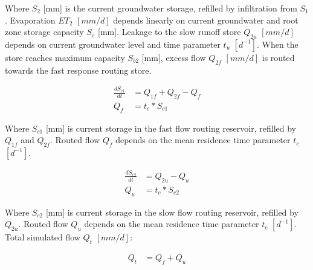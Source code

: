 Where $S_2$ [mm] is the current groundwater storage, refilled by infiltration from $S_1$. Evaporation $ET_2$ $[mm/d]$ depends linearly on current groundwater and root zone storage capacity $S_e$ [mm]. Leakage to the slow runoff store $Q_{2u}$ $[mm/d]$ depends on current groundwater level and time parameter $t_u$ $[d^{-1}]$. When the store reaches maximum capacity $S_{b2}$ [mm], excess flow $Q_{2f}$ $[mm/d]$ is routed towards the fast response routing store.

\begin{align}
	\frac{dS_{c1}}{dt} &= Q_{1f}+Q_{2f}-Q_{f}\\
	Q_f &= t_c*S_{c1}
\end{align}

Where $S_{c1}$ [mm] is current storage in the fast flow routing reservoir, refilled by $Q_{1f}$ and $Q_{2f}$. Routed flow $Q_f$ depends on the mean residence time parameter $t_c$ $[d^{-1}]$.

\begin{align}
	\frac{dS_{c2}}{dt} &= Q_{2u}-Q_{u}\\
	Q_u &= t_c*S_{c2}
\end{align}

Where $S_{c2}$ [mm] is current storage in the slow flow routing reservoir, refilled by $Q_{2u}$. Routed flow $Q_u$ depends on the mean residence time parameter $t_c$ $[d^{-1}]$. Total simulated flow $Q_t$ $[mm/d]$:

\begin{align}
	Q_t &= Q_f + Q_u
\end{align}


